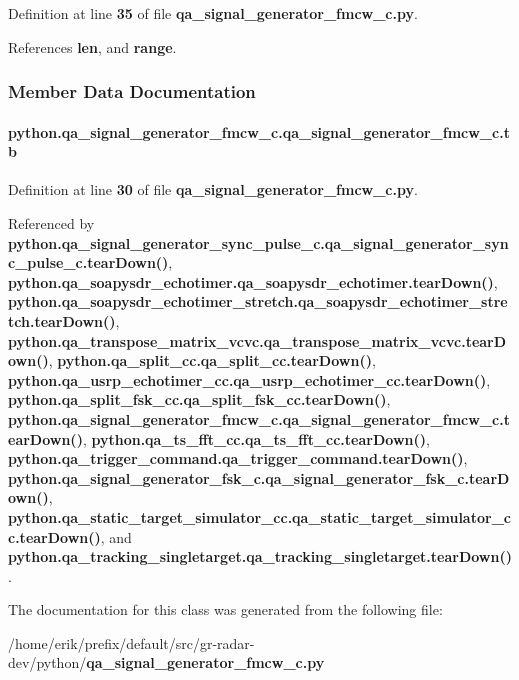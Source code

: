 Definition at line {\bf 35} of file {\bf qa\+\_\+signal\+\_\+generator\+\_\+fmcw\+\_\+c.\+py}.



References {\bf len}, and {\bf range}.



\subsubsection{Member Data Documentation}
\paragraph[{tb}]{\setlength{\rightskip}{0pt plus 5cm}python.\+qa\+\_\+signal\+\_\+generator\+\_\+fmcw\+\_\+c.\+qa\+\_\+signal\+\_\+generator\+\_\+fmcw\+\_\+c.\+tb}\label{classpython_1_1qa__signal__generator__fmcw__c_1_1qa__signal__generator__fmcw__c_a080f62b73a4ae1afe985e3303db364de}


Definition at line {\bf 30} of file {\bf qa\+\_\+signal\+\_\+generator\+\_\+fmcw\+\_\+c.\+py}.



Referenced by {\bf python.\+qa\+\_\+signal\+\_\+generator\+\_\+sync\+\_\+pulse\+\_\+c.\+qa\+\_\+signal\+\_\+generator\+\_\+sync\+\_\+pulse\+\_\+c.\+tear\+Down()}, {\bf python.\+qa\+\_\+soapysdr\+\_\+echotimer.\+qa\+\_\+soapysdr\+\_\+echotimer.\+tear\+Down()}, {\bf python.\+qa\+\_\+soapysdr\+\_\+echotimer\+\_\+stretch.\+qa\+\_\+soapysdr\+\_\+echotimer\+\_\+stretch.\+tear\+Down()}, {\bf python.\+qa\+\_\+transpose\+\_\+matrix\+\_\+vcvc.\+qa\+\_\+transpose\+\_\+matrix\+\_\+vcvc.\+tear\+Down()}, {\bf python.\+qa\+\_\+split\+\_\+cc.\+qa\+\_\+split\+\_\+cc.\+tear\+Down()}, {\bf python.\+qa\+\_\+usrp\+\_\+echotimer\+\_\+cc.\+qa\+\_\+usrp\+\_\+echotimer\+\_\+cc.\+tear\+Down()}, {\bf python.\+qa\+\_\+split\+\_\+fsk\+\_\+cc.\+qa\+\_\+split\+\_\+fsk\+\_\+cc.\+tear\+Down()}, {\bf python.\+qa\+\_\+signal\+\_\+generator\+\_\+fmcw\+\_\+c.\+qa\+\_\+signal\+\_\+generator\+\_\+fmcw\+\_\+c.\+tear\+Down()}, {\bf python.\+qa\+\_\+ts\+\_\+fft\+\_\+cc.\+qa\+\_\+ts\+\_\+fft\+\_\+cc.\+tear\+Down()}, {\bf python.\+qa\+\_\+trigger\+\_\+command.\+qa\+\_\+trigger\+\_\+command.\+tear\+Down()}, {\bf python.\+qa\+\_\+signal\+\_\+generator\+\_\+fsk\+\_\+c.\+qa\+\_\+signal\+\_\+generator\+\_\+fsk\+\_\+c.\+tear\+Down()}, {\bf python.\+qa\+\_\+static\+\_\+target\+\_\+simulator\+\_\+cc.\+qa\+\_\+static\+\_\+target\+\_\+simulator\+\_\+cc.\+tear\+Down()}, and {\bf python.\+qa\+\_\+tracking\+\_\+singletarget.\+qa\+\_\+tracking\+\_\+singletarget.\+tear\+Down()}.



The documentation for this class was generated from the following file\+:\begin{DoxyCompactItemize}
\item 
/home/erik/prefix/default/src/gr-\/radar-\/dev/python/{\bf qa\+\_\+signal\+\_\+generator\+\_\+fmcw\+\_\+c.\+py}\end{DoxyCompactItemize}
